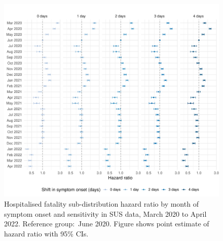 \begin{figure}[htbp!]
    \centering
    \includegraphics[width=\textwidth]{fg_shift.pdf}
    \caption[Hospitalised fatality sub-distribution hazard ratio by month of symptom onset and sensitivity in SUS data, March 2020 to April 2022]{Hospitalised fatality sub-distribution hazard ratio by month of symptom onset and sensitivity in SUS data, March 2020 to April 2022. Reference group:\ June 2020. Figure shows point estimate of hazard ratio with 95\% CIs.}\label{fig:fg-shift}
\end{figure}